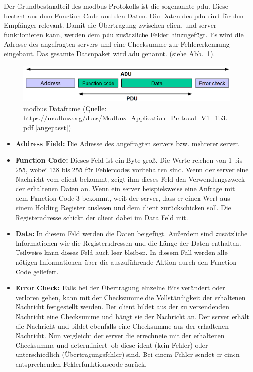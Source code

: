 Der Grundbestandteil des \gls{modbus} Protokolls ist die sogenannte \acf{pdu}. Diese besteht aus dem Function Code und den Daten. Die Daten des \acs{pdu} sind für den Empfänger relevant. Damit die Übertragung zwischen \gls{client} und \gls{server} funktionieren kann, werden dem \acs{pdu} zusätzliche Felder hinzugefügt. Es wird die Adresse des angefragten \gls{server}s und eine Checksumme zur Fehlererkennung eingebaut. Das gesamte Datenpaket wird \acf{adu} genannt.
(siehe Abb.~\ref{fig:modbus_adu_pdu}).
\begin{figure}[H]
	\centering
	\includegraphics[width=1.0\linewidth]{Bilder/General_Modbus_Frame_Changed}
	\caption{\gls{modbus} Dataframe (Quelle: \url{https://modbus.org/docs/Modbus_Application_Protocol_V1_1b3.pdf} [angepasst])}
	\label{fig:modbus_adu_pdu}
\end{figure}

\begin{itemize}
	\item \textbf{Address Field:} Die Adresse des angefragten \gls{server}s bzw. mehrerer \gls{server}. 
	\item \textbf{Function Code:} Dieses Feld ist ein Byte groß. Die Werte reichen von 1 bis 255, wobei 128 bis 255 für Fehlercodes vorbehalten sind. Wenn der \gls{server} eine Nachricht vom \gls{client} bekommt, zeigt ihm dieses Feld den Verwendungszweck der erhaltenen Daten an. Wenn ein \gls{server} beispielsweise eine Anfrage mit dem Function Code 3 bekommt, weiß der \gls{server}, dass er einen Wert aus einem Holding Register auslesen und dem \gls{client} zurückschicken soll. Die Registeradresse schickt der \gls{client} dabei im Data Feld mit.
	\item \textbf{Data:} In diesem Feld werden die Daten beigefügt. Außerdem sind zusätzliche Informationen wie die Registeradressen und die Länge der Daten enthalten. Teilweise kann dieses Feld auch leer bleiben. In diesem Fall werden alle nötigen Informationen über die auszuführende Aktion durch den Function Code geliefert. 
	\item \textbf{Error Check:} Falls bei der Übertragung einzelne Bits verändert oder verloren gehen, kann mit der Checksumme die Vollständigkeit der erhaltenen Nachricht festgestellt werden. Der \gls{client} bildet aus der zu versendenden Nachricht eine Checksumme und hängt sie der Nachricht an. Der \gls{server} erhält die Nachricht und bildet ebenfalls eine Checksumme aus der erhaltenen Nachricht. Nun vergleicht der \gls{server} die errechnete mit der erhaltenen Checksumme und determiniert, ob diese ident (kein Fehler) oder unterschiedlich (Übertragungsfehler) sind. Bei einem Fehler sendet er einen entsprechenden Fehlerfunktionscode zurück.
\end{itemize}

